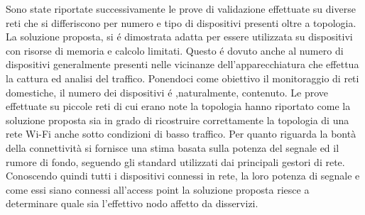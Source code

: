 Sono state riportate successivamente le prove di validazione effettuate su diverse reti che si differiscono per numero e tipo di dispositivi presenti oltre a topologia.
La soluzione proposta, si \'e dimostrata adatta per essere utilizzata su dispositivi con risorse di memoria e calcolo limitati.
Questo \'e dovuto anche al numero di dispositivi generalmente presenti nelle vicinanze dell'apparecchiatura che effettua la cattura ed analisi del traffico.
Ponendoci come obiettivo il monitoraggio di reti domestiche, il numero dei dispositivi \'e ,naturalmente, contenuto.
Le prove effettuate su piccole reti di cui erano note la topologia hanno riportato come la soluzione proposta sia in grado di ricostruire correttamente la topologia di una rete Wi-Fi anche sotto condizioni di basso traffico.
Per quanto riguarda la bont\`a della connettivit\`a si fornisce una stima basata sulla potenza del segnale ed il rumore di fondo, seguendo gli standard utilizzati dai principali gestori di rete.
Conoscendo quindi tutti i dispositivi connessi in rete, la loro potenza di segnale e  come essi siano connessi all'access point la soluzione proposta riesce a determinare  quale sia l'effettivo nodo affetto da disservizi.

